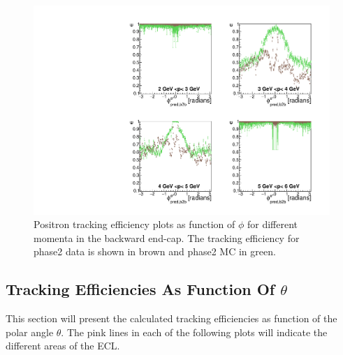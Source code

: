 \documentclass[a4paper,11pt,twosided,final,german,openbib,pdftex,listof=totoc,bibliography=totoc]{scrbook}
\begin{document}
\begin{figure}[!htbp]
	\centering
	\includegraphics[width=\textwidth]{Plots/master/xPMPhiepEC}
	\caption[Momentum $\phi$ Positron Backward End-Cap Efficiency Phase2]{Positron tracking efficiency plots as function of  $\phi$ for different momenta in the backward end-cap. The tracking efficiency for phase2 data is shown in brown and phase2 MC in green.}
	
	\label{plt:xPMPhiepEC}
\end{figure}

\clearpage


\subsection{Tracking Efficiencies As Function Of $\theta$}

This section will present the calculated tracking efficiencies as function of the polar angle $\theta$. The pink lines in each of the following plots will indicate the different areas of the ECL.
\end{document}
